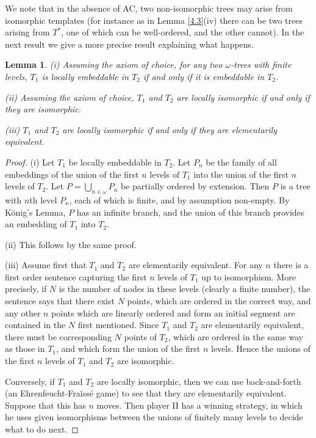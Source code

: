 \documentclass[a4paper,reqno]{amsart}
\numberwithin{equation}{section}
\newtheorem{lemma}[theorem]{Lemma}
\begin{document}
We note that in the absence of AC, two non-isomorphic trees may arise from isomorphic templates (for instance as in
Lemma \ref{4.3}(iv) there can be two trees arising from $T^*$, one of which can be well-ordered, and the other cannot). 
In the next result we give a more precise result explaining what happens. 

\begin{lemma} (i) Assuming the axiom of choice, for any two $\omega$-trees with finite levels, $T_1$ 
is locally embeddable in $T_2$ if and only if it is embeddable in $T_2$.

(ii) Assuming the axiom of choice, $T_1$ and $T_2$ are locally isomorphic if and only if they
are isomorphic.

(iii) $T_1$ and $T_2$ are locally isomorphic if and only if they are elementarily equivalent. \label{4.4}  \end{lemma}

\begin{proof}  
(i) Let $T_1$ be locally embeddable in $T_2$. Let $P_n$ be the family of all embeddings of the union of the
first $n$ levels of $T_1$ into the union of the first $n$ levels of $T_2$. Let $P = \bigcup_{n \in \omega}P_n$
be partially ordered by extension. Then $P$ is a tree with $n$th level $P_n$, each of which is finite, and by
assumption non-empty. By K\"onig's Lemma, $P$ has an infinite branch, and the union of this branch provides an
embedding of $T_1$ into $T_2$.

(ii) This follows by the same proof. 

(iii) Assume first that $T_1$ and $T_2$ are elementarily equivalent. For any $n$ there is a first order sentence
capturing the first $n$ levels of $T_1$ up to isomorphism. More precisely, if $N$ is the number of nodes in these
levels (clearly a finite number), the sentence says that there exist $N$ points, which are ordered in the
correct way, and any other $n$ points which are linearly ordered and form an initial segment are contained in
the $N$ first mentioned. Since $T_1$ and $T_2$ are elementarily equivalent, there must be corresponding $N$ points
of $T_2$, which are ordered in the same way as those in $T_1$, and which form the union of the first $n$ levels.
Hence the unions of the first $n$ levels of $T_1$ and $T_2$ are isomorphic.

Conversely, if $T_1$ and $T_2$ are locally isomorphic, then we can use back-and-forth (an
Ehrenfeucht-Fra\"iss\'e game) to see that they are elementarily equivalent. Suppose that this has $n$
moves. Then player II has a winning strategy, in which he uses given isomorphisms between the unions of
finitely many levels to decide what to do next.          \end{proof}
\end{document}
